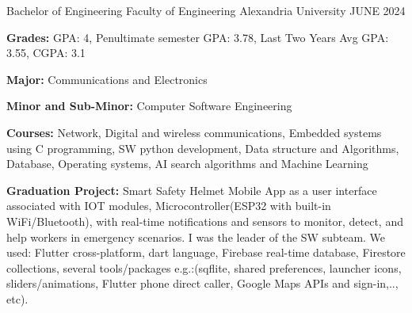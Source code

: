 

\begin{cventries}

  \cventry
    {Bachelor of Engineering} %
    {Faculty of Engineering } %
    {Alexandria University} %
    {JUNE 2024} %
    {
      \begin{cvitems} %
        \item {\textbf{Grades:} \hspace{0.05 cm} GPA: 4,\hspace{0.1 cm} Penultimate semester GPA: 3.78,\hspace{0.1 cm} Last Two Years Avg GPA: 3.55,\hspace{0.1 cm} CGPA: 3.1}
        \item {\textbf{Major:} Communications and Electronics}
        \item {\textbf{Minor and Sub-Minor:} Computer Software Engineering }
        \item {\textbf{Courses:} Network, Digital and wireless communications, Embedded systems using C programming, SW python development, Data structure and Algorithms, Database, Operating systems, AI search algorithms and Machine Learning}
        \item {\textbf{Graduation Project:} Smart Safety Helmet Mobile App as a user interface associated with IOT modules, Microcontroller(ESP32 with built-in WiFi/Bluetooth), with real-time notifications and sensors to monitor, detect, and help workers in emergency scenarios. I was the leader of the SW subteam. We used: Flutter cross-platform, dart language, Firebase real-time database, Firestore collections, several tools/packages e.g.:(sqflite, shared preferences, launcher icons, sliders/animations, Flutter phone direct caller, Google Maps APIs and sign-in,.., etc).}
      \end{cvitems}
    }

\end{cventries}
